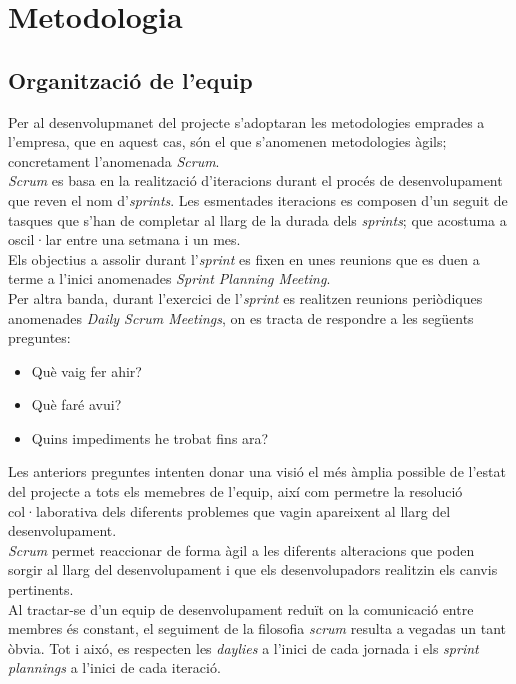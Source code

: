 \section{Metodologia}
\label{methodology}
\subsection{Organització de l'equip}

Per al desenvolupmanet del projecte s'adoptaran les metodologies emprades a l'empresa, que en aquest cas, són el que s'anomenen metodologies àgils; concretament l'anomenada \textit{Scrum}\cite{scrum}.\\
\textit{Scrum} es basa en la realització d'iteracions durant el procés de desenvolupament que reven el nom d'\textit{sprints}. Les esmentades iteracions es composen d'un seguit de tasques que s'han de completar al llarg de la durada dels \textit{sprints}; que acostuma a oscil·lar entre una setmana i un mes.\\
Els objectius a assolir durant l'\textit{sprint} es fixen en unes reunions que es duen a terme a l'inici anomenades \textit{Sprint Planning Meeting}.\\
Per altra banda, durant l'exercici de l'\textit{sprint} es realitzen reunions periòdiques anomenades \textit{Daily Scrum Meetings}, on es tracta de respondre a les següents preguntes:

\begin{itemize}
	\item Què vaig fer ahir?
	\item Què faré avui?
	\item Quins impediments he trobat fins ara?
\end{itemize}
Les anteriors preguntes intenten donar una visió el més àmplia possible de l'estat del projecte a tots els memebres de l'equip, així com permetre la resolució col·laborativa dels diferents problemes que vagin apareixent al llarg del desenvolupament.\\
\textit{Scrum} permet reaccionar de forma àgil a les diferents alteracions que poden sorgir al llarg del desenvolupament i que els desenvolupadors realitzin els canvis pertinents.\\
Al tractar-se d'un equip de desenvolupament reduït on la comunicació entre membres és constant, el seguiment de la filosofia \textit{scrum} resulta a vegadas un tant òbvia. Tot i aixó, es respecten les \textit{daylies} a l'inici de cada jornada i els \textit{sprint plannings} a l'inici de cada iteració.


